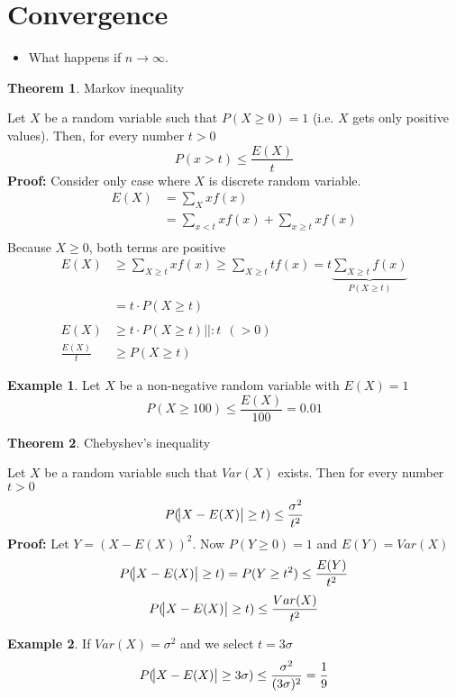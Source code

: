\documentclass[10pt, twoside, a4paper]{book}
\theoremstyle{definition}
\newtheorem{example}{Example}[chapter]
\newtheorem{theorem}{Theorem}[chapter]
\begin{document}
\section{Convergence}
\begin{itemize}
  \item What happens if $n \to \infty$.
\end{itemize}
\begin{theorem}
Markov inequality

Let $X$ be a random variable such that $P(X \geq 0) = 1$ (i.e. $X$ gets only
positive values). Then, for every number $t > 0$
$$P(x > t) \leq \frac{E(X)}{t}$$
\textbf{Proof:} Consider only case where $X$ is discrete random variable.
\begin{equation*}
\renewcommand{\arraystretch}{1.6}
\begin{array}{ll}
E(X) & = \sum_X x f(x) \\
& = \sum_{x<t}x f(x) + \sum_{x \geq t} x f(x) \\
\end{array}
\end{equation*}
Because $X \geq 0$, both terms are positive
\begin{equation*}
\renewcommand{\arraystretch}{1.6}
\begin{array}{ll}
E(X) & \geq \sum_{X \geq t}xf(x) \geq \sum_{X \geq t} t f(x) = t
\underbrace{\sum_{X \geq t} f(x)}_{P(X\geq t)} \\
& = t \cdot P(X\geq t) \\
& \\
E(X) & \geq t \cdot P(X\geq t) || :t ~~ (>0)\\
\frac{E(X)}{t} & \geq P(X\geq t)
\end{array}
\end{equation*}
\end{theorem}
\begin{example} Let $X$ be a non-negative random variable with $E(X) = 1$
$$P(X \geq 100) \leq \frac{E(X)}{100} = 0.01$$
\end{example}
\begin{theorem} Chebyshev's inequality

Let $X$ be a random variable such that $Var(X)$ exists. Then for every number
$t > 0$
$$P(\abs{X-E(X)} \geq t) \leq \frac{\sigma^2}{t^2}$$
\textbf{Proof:} Let $Y=(X-E(X))^2$. Now $P(Y \geq 0) = 1$ and $E(Y) = Var(X)$
$$P(\abs{X - E(X)} \geq t) = P(Y \geq t^2) \leq \frac{E(Y)}{t^2}$$
$$P(\abs{X - E(X)} \geq t) \leq \frac{Var(X)}{t^2}$$
\end{theorem}
\begin{example} If $Var(X) = \sigma^2$ and we select $t=3\sigma$
$$P(\abs{X-E(X)} \geq 3 \sigma) \leq \frac{\sigma^2}{(3\sigma)^2} =
\frac{1}{9}$$
\end{example}
\end{document}
